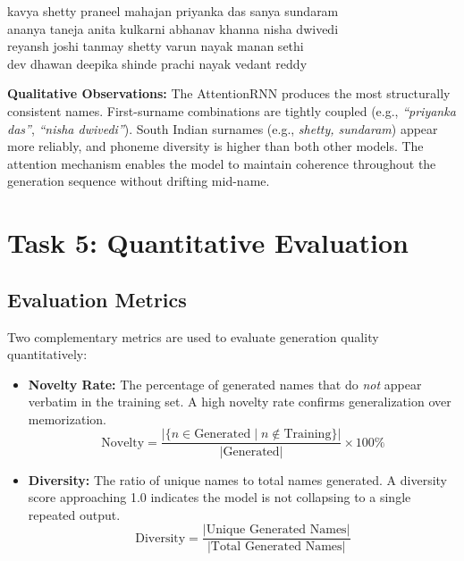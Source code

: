 \documentclass[11pt,a4paper]{article}
\begin{document}
\begin{codeBox}[Selected AttentionRNN Generated Names (Temperature = 0.8)]
kavya shetty \quad praneel mahajan \quad priyanka das \quad sanya sundaram \\
ananya taneja \quad anita kulkarni \quad abhanav khanna \quad nisha dwivedi \\
reyansh joshi \quad tanmay shetty \quad varun nayak \quad manan sethi \\
dev dhawan \quad deepika shinde \quad prachi nayak \quad vedant reddy
\end{codeBox}

\vspace{0.5em}
\textbf{Qualitative Observations:} The AttentionRNN produces the most structurally consistent names. First-surname combinations are tightly coupled (e.g., \textit{``priyanka das''}, \textit{``nisha dwivedi''}). South Indian surnames (e.g., \textit{shetty, sundaram}) appear more reliably, and phoneme diversity is higher than both other models. The attention mechanism enables the model to maintain coherence throughout the generation sequence without drifting mid-name.

\clearpage
\section{Task 5: Quantitative Evaluation}

\subsection{Evaluation Metrics}
Two complementary metrics are used to evaluate generation quality quantitatively:

\begin{itemize}[label=\textcolor{iitjblue}{\textbullet}, itemsep=0.5em]
    \justifying
    \item \textbf{Novelty Rate:} The percentage of generated names that do \textit{not} appear verbatim in the training set. A high novelty rate confirms generalization over memorization.
    \[ \text{Novelty} = \frac{|\{n \in \text{Generated} \mid n \notin \text{Training}\}|}{|\text{Generated}|} \times 100\% \]
    \item \textbf{Diversity:} The ratio of unique names to total names generated. A diversity score approaching 1.0 indicates the model is not collapsing to a single repeated output.
    \[ \text{Diversity} = \frac{|\text{Unique Generated Names}|}{|\text{Total Generated Names}|} \]
\end{itemize}
\end{document}
